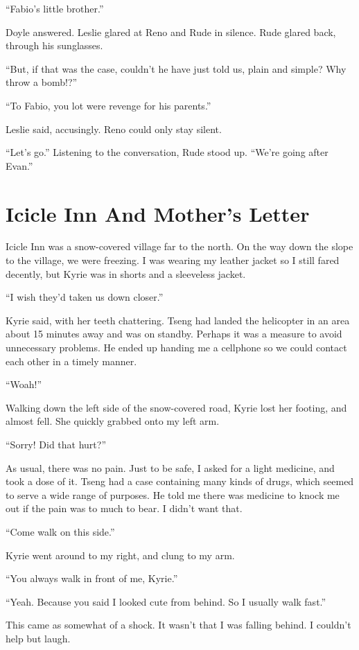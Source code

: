 \documentclass[oneside]{book}
\begin{document}
“Fabio’s little brother.”

Doyle answered. Leslie glared at Reno and Rude in silence. Rude glared back, through his sunglasses.

“But, if that was the case, couldn’t he have just told us, plain and simple? Why throw a bomb!?”

“To Fabio, you lot were revenge for his parents.”

Leslie said, accusingly. Reno could only stay silent.

“Let’s go.” Listening to the conversation, Rude stood up. “We’re going after Evan.”

\chapter{Icicle Inn And Mother’s Letter}
Icicle Inn was a snow-covered village far to the north. On the way down the slope to the village, we were freezing. I was wearing my leather jacket so I still fared decently, but Kyrie was in shorts and a sleeveless jacket.

“I wish they’d taken us down closer.”

Kyrie said, with her teeth chattering. Tseng had landed the helicopter in an area about 15 minutes away and was on standby. Perhaps it was a measure to avoid unnecessary problems. He ended up handing me a cellphone so we could contact each other in a timely manner.

“Woah!”

Walking down the left side of the snow-covered road, Kyrie lost her footing, and almost fell. She quickly grabbed onto my left arm.

“Sorry! Did that hurt?”

As usual, there was no pain. Just to be safe, I asked for a light medicine, and took a dose of it. Tseng had a case containing many kinds of drugs, which seemed to serve a wide range of purposes. He told me there was medicine to knock me out if the pain was to much to bear. I didn’t want that.

“Come walk on this side.”

Kyrie went around to my right, and clung to my arm.

“You always walk in front of me, Kyrie.”

“Yeah. Because you said I looked cute from behind. So I usually walk fast.”

This came as somewhat of a shock. It wasn’t that I was falling behind. I couldn’t help but laugh.
\end{document}
